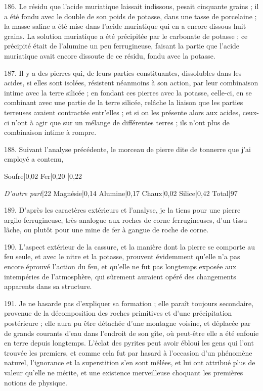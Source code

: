 \documentclass[a4paper, 11pt, oneside, polutonikogreek, french]{article}
\begin{document}
186. Le résidu que l'acide muriatique laissait indissous, pesait cinquante grains ; il a été fondu avec le double de son poids de potasse, dans une tasse de porcelaine ; la masse saline a été mise dans l'acide muriatique qui en a encore dissous huit grains. La solution muriatique a été précipitée par le carbonate de potasse ; ce précipité était de l'alumine un peu ferrugineuse, faisant la partie que l'acide muriatique avait encore dissoute de ce résidu, fondu avec la potasse.

187. Il y a des pierres qui, de leurs parties constituantes, dissolubles dans les acides, si elles sont isolées, résistent néanmoins à son action, par leur combinaison intime avec la terre silicée ; en fondant ces pierres avec la potasse, celle-ci, en se combinant avec une partie de la terre silicée, relâche la liaison que les parties terreuses avaient contractée entr'elles ; et si on les présente alors aux acides, ceux-ci n'ont à agir que sur un mélange de différentes terres ; ils n'ont plus de combinaison intime à rompre.

188. Suivant l'analyse précédente, le
morceau de pierre dite de tonnerre que j'ai
employé a contenu,

Soufre|0,02
Fer|0,20
|0,22

\emph{D'autre part}|22
Magnésie|0,14
Alumine|0,17
Chaux|0,02
Silice|0,42
Total|97

189. D'après les caractères extérieurs et l'analyse, je la tiens pour une pierre argilo-ferrugineuse, très-analogue aux roches de corne ferrugineuses, d'un tissu lâche, ou plutôt pour une mine de fer à gangue de roche de corne.

190. L'aspect extérieur de la cassure, et la manière dont la pierre se comporte au feu seule, et avec le nitre et la potasse, prouvent évidemment qu'elle n'a pas encore éprouvé l'action du feu, et qu'elle ne fut pas longtemps exposée aux intempéries de l'atmosphère, qui sûrement auraient opéré des changements apparents dans sa structure.

191. Je ne hasarde pas d'expliquer sa formation ; elle paraît toujours secondaire, provenue de la décomposition des roches primitives et d'une précipitation postérieure ; elle aura pu être détachée d'une montagne voisine, et déplacée par de grands courants d'eau dans l'endroit de son gîte, où peut-être elle a été enfouie en terre depuis longtemps. L'éclat des pyrites peut avoir ébloui les gens qui l'ont trouvée les premiers, et comme cela fut par hasard à l'occasion d'un phénomène naturel, l'ignorance et la superstition s'en sont mêlées, et lui ont attribué plus de valeur qu'elle ne mérite, et une existence merveilleuse choquant les premières notions de physique.
\end{document}
